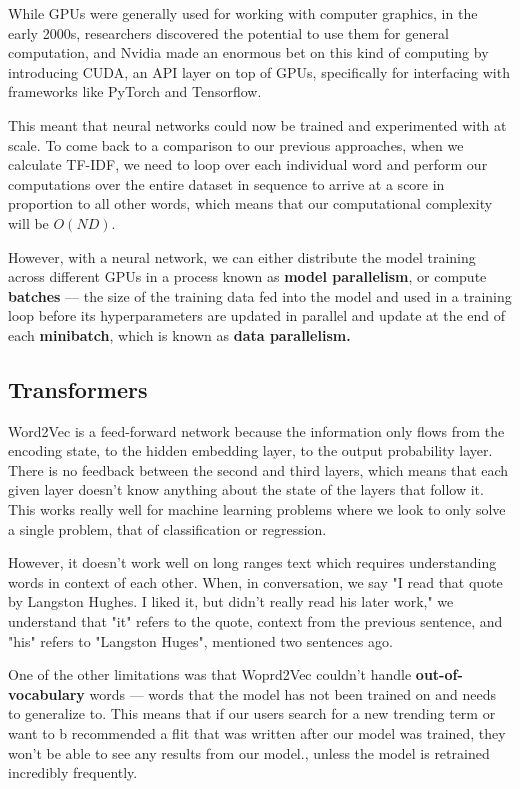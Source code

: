 \documentclass[11pt, table]{diazessay} %
\begin{document}
\begin{sloppypar}
While GPUs were generally used for working with computer graphics, in the early 2000s\citep{oancea2014gpgpu}, researchers discovered the potential to use them for general computation, and Nvidia made an enormous bet on this kind of computing by introducing CUDA, an API layer on top of GPUs, specifically for interfacing with frameworks like PyTorch and Tensorflow.

This meant that neural networks could now be trained and experimented with at scale. To come back to a comparison to our previous approaches, when we calculate TF-IDF, we need to loop over each individual word and perform our computations over the entire dataset in sequence to arrive at a score in proportion to all other words, which means that our computational complexity will be $O(N D)$\citep{cong2016novel}.  

However, with a neural network, we can either distribute the model training across different GPUs in a process known as \textbf{model parallelism}, or compute \textbf{batches} --- the size of the training data fed into the model and used in a training loop before its hyperparameters are updated in parallel and update at the end of each \textbf{minibatch}, which is known as \textbf{data parallelism.}\citep{shallue2018measuring}


\subsection{Transformers}

Word2Vec is a feed-forward network because the information only flows from the encoding state, to the hidden embedding layer, to the output probability layer. There is no feedback between the second and third layers, which means that each given layer doesn't know anything about the state of the layers that follow it. This works really well for  machine learning problems where we look to only solve a single problem, that of classification or regression. 

However, it doesn't work well on long ranges text which requires understanding words in context of each other. When, in conversation, we say "I read that quote by Langston Hughes. I liked it, but didn't really read his later work," we understand that "it" refers to the quote, context from the previous sentence, and "his" refers to "Langston Huges", mentioned two sentences ago. 

One of the other limitations was that Woprd2Vec couldn't handle \textbf{out-of-vocabulary} words --- words that the model has not been trained on and needs to generalize to. This means that if our users search for a new trending term or want to b recommended a flit that was written after our model was trained, they won't be able to see any results from our model.\citep{di2021considerations}, unless the model is retrained incredibly frequently. 


\end{sloppypar}
\end{document}
